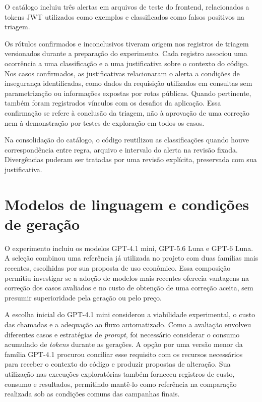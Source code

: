 O catálogo incluiu três alertas em arquivos de teste do frontend, relacionados a tokens JWT utilizados como exemplos e classificados como falsos positivos na triagem.

Os rótulos confirmados e inconclusivos tiveram origem nos registros de triagem versionados durante a preparação do experimento. Cada registro associou uma ocorrência a uma classificação e a uma justificativa sobre o contexto do código. Nos casos confirmados, as justificativas relacionaram o alerta a condições de insegurança identificadas, como dados da requisição utilizados em consultas sem parametrização ou informações expostas por rotas públicas. Quando pertinente, também foram registrados vínculos com os desafios da aplicação. Essa confirmação se refere à conclusão da triagem, não à aprovação de uma correção nem à demonstração por testes de exploração em todos os casos.

Na consolidação do catálogo, o código reutilizou as classificações quando houve correspondência entre regra, arquivo e intervalo do alerta na revisão fixada. Divergências puderam ser tratadas por uma revisão explícita, preservada com sua justificativa.

\section{Modelos de linguagem e condições de geração}
\label{sec:met-modelos}

O experimento incluiu os modelos GPT-4.1 mini, GPT-5.6 Luna e GPT-6 Luna. A seleção combinou uma referência já utilizada no projeto com duas famílias mais recentes, escolhidas por sua proposta de uso econômico. Essa composição permitiu investigar se a adoção de modelos mais recentes oferecia vantagens na correção dos casos avaliados e no custo de obtenção de uma correção aceita, sem presumir superioridade pela geração ou pelo preço.

A escolha inicial do GPT-4.1 mini considerou a viabilidade experimental, o custo das chamadas e a adequação ao fluxo automatizado. Como a avaliação envolveu diferentes casos e estratégias de \textit{prompt}, foi necessário considerar o consumo acumulado de \textit{tokens} durante as gerações. A opção por uma versão menor da família GPT-4.1 procurou conciliar esse requisito com os recursos necessários para receber o contexto do código e produzir propostas de alteração. Sua utilização nas execuções exploratórias também forneceu registros de custo, consumo e resultados, permitindo mantê-lo como referência na comparação realizada sob as condições comuns das campanhas finais.

